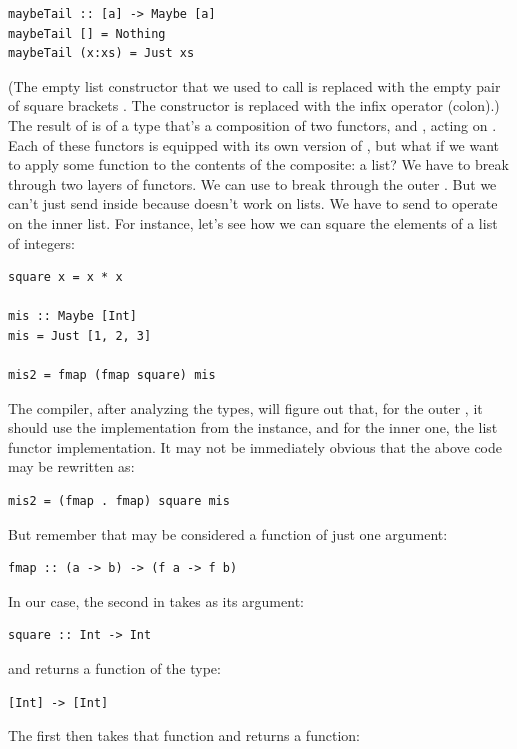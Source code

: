 \begin{Verbatim}
maybeTail :: [a] -> Maybe [a]
maybeTail [] = Nothing
maybeTail (x:xs) = Just xs
\end{Verbatim}
(The empty list constructor that we used to call  is
replaced with the empty pair of square brackets \code{{[}{]}}. The
 constructor is replaced with the infix operator \code{:}
(colon).) The result of  is of a type that's a
composition of two functors,  and \code{{[}{]}}, acting
on . Each of these functors is equipped with its own version
of , but what if we want to apply some function 
to the contents of the composite: a  list? We have to
break through two layers of functors. We can use  to break
through the outer . But we can't just send 
inside  because  doesn't work on lists. We have
to send  to operate on the inner list. For instance,
let's see how we can square the elements of a  list of
integers:

\begin{Verbatim}
square x = x * x

mis :: Maybe [Int]
mis = Just [1, 2, 3]

mis2 = fmap (fmap square) mis
\end{Verbatim}
The compiler, after analyzing the types, will figure out that, for the
outer , it should use the implementation from the
 instance, and for the inner one, the list functor
implementation. It may not be immediately obvious that the above code
may be rewritten as:

\begin{Verbatim}
mis2 = (fmap . fmap) square mis
\end{Verbatim}
But remember that  may be considered a function of just one
argument:

\begin{Verbatim}
fmap :: (a -> b) -> (f a -> f b)
\end{Verbatim}
In our case, the second  in  takes
as its argument:

\begin{Verbatim}
square :: Int -> Int
\end{Verbatim}
and returns a function of the type:

\begin{Verbatim}
[Int] -> [Int]
\end{Verbatim}
The first  then takes that function and returns a function:

